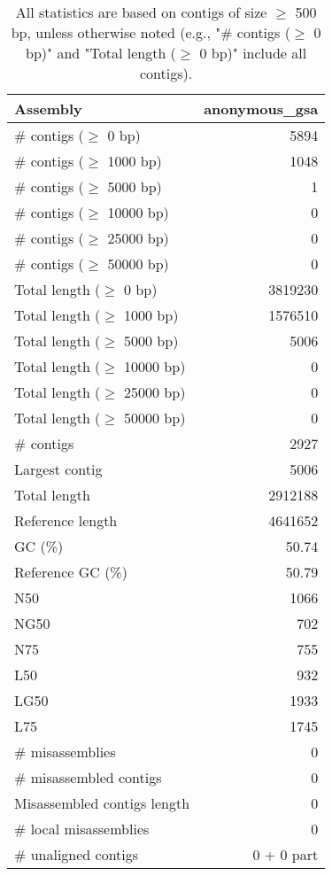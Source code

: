 \documentclass[12pt,a4paper]{article}
\begin{document}
\begin{table}[ht]
\begin{center}
\caption{All statistics are based on contigs of size $\geq$ 500 bp, unless otherwise noted (e.g., "\# contigs ($\geq$ 0 bp)" and "Total length ($\geq$ 0 bp)" include all contigs).}
\begin{tabular}{|l*{1}{|r}|}
\hline
Assembly & anonymous\_gsa \\ \hline
\# contigs ($\geq$ 0 bp) & 5894 \\ \hline
\# contigs ($\geq$ 1000 bp) & 1048 \\ \hline
\# contigs ($\geq$ 5000 bp) & 1 \\ \hline
\# contigs ($\geq$ 10000 bp) & 0 \\ \hline
\# contigs ($\geq$ 25000 bp) & 0 \\ \hline
\# contigs ($\geq$ 50000 bp) & 0 \\ \hline
Total length ($\geq$ 0 bp) & 3819230 \\ \hline
Total length ($\geq$ 1000 bp) & 1576510 \\ \hline
Total length ($\geq$ 5000 bp) & 5006 \\ \hline
Total length ($\geq$ 10000 bp) & 0 \\ \hline
Total length ($\geq$ 25000 bp) & 0 \\ \hline
Total length ($\geq$ 50000 bp) & 0 \\ \hline
\# contigs & 2927 \\ \hline
Largest contig & 5006 \\ \hline
Total length & 2912188 \\ \hline
Reference length & 4641652 \\ \hline
GC (\%) & 50.74 \\ \hline
Reference GC (\%) & 50.79 \\ \hline
N50 & 1066 \\ \hline
NG50 & 702 \\ \hline
N75 & 755 \\ \hline
L50 & 932 \\ \hline
LG50 & 1933 \\ \hline
L75 & 1745 \\ \hline
\# misassemblies & 0 \\ \hline
\# misassembled contigs & 0 \\ \hline
Misassembled contigs length & 0 \\ \hline
\# local misassemblies & 0 \\ \hline
\# unaligned contigs & 0 + 0 part \\ \hline

\end{tabular}
\end{center}
\end{table}
\end{document}
